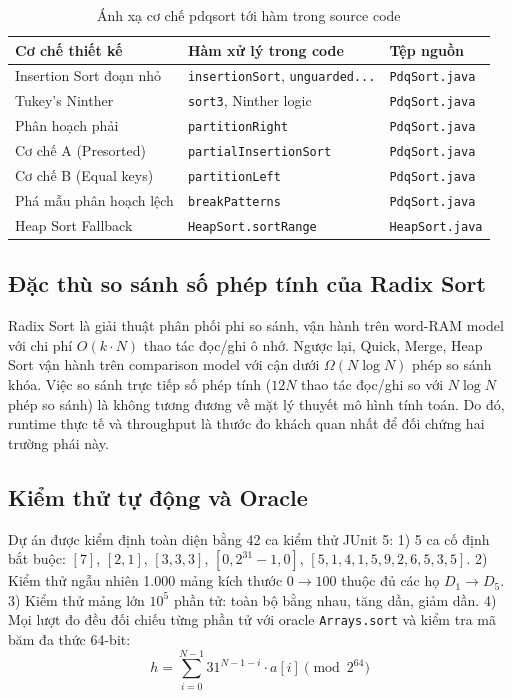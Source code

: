 \documentclass[conference]{IEEEtran}
\begin{document}
\begin{table}[htbp]
\caption{Ánh xạ cơ chế pdqsort tới hàm trong source code}
\label{tab:code_mapping}
\centering
\footnotesize
\setlength{\tabcolsep}{2.5pt}
\begin{tabularx}{\columnwidth}{@{}l X l@{}}
\toprule
\textbf{Cơ chế thiết kế} & \textbf{Hàm xử lý trong code} & \textbf{Tệp nguồn} \\
\midrule
Insertion Sort đoạn nhỏ & \texttt{insertionSort}, \texttt{unguarded...} & \texttt{PdqSort.java} \\
Tukey's Ninther & \texttt{sort3}, Ninther logic & \texttt{PdqSort.java} \\
Phân hoạch phải & \texttt{partitionRight} & \texttt{PdqSort.java} \\
Cơ chế A (Presorted) & \texttt{partialInsertionSort} & \texttt{PdqSort.java} \\
Cơ chế B (Equal keys) & \texttt{partitionLeft} & \texttt{PdqSort.java} \\
Phá mẫu phân hoạch lệch & \texttt{breakPatterns} & \texttt{PdqSort.java} \\
Heap Sort Fallback & \texttt{HeapSort.sortRange} & \texttt{HeapSort.java} \\
\bottomrule
\end{tabularx}
\end{table}

\subsection{Đặc thù so sánh số phép tính của Radix Sort}
Radix Sort là giải thuật phân phối phi so sánh, vận hành trên word-RAM model với chi phí $O(k \cdot N)$ thao tác đọc/ghi ô nhớ. Ngược lại, Quick, Merge, Heap Sort vận hành trên comparison model với cận dưới $\Omega(N \log N)$ phép so sánh khóa. Việc so sánh trực tiếp số phép tính ($12N$ thao tác đọc/ghi so với $N \log N$ phép so sánh) là không tương đương về mặt lý thuyết mô hình tính toán. Do đó, runtime thực tế và throughput là thước đo khách quan nhất để đối chứng hai trường phái này.

\subsection{Kiểm thử tự động và Oracle}
Dự án được kiểm định toàn diện bằng 42 ca kiểm thử JUnit 5:
1) 5 ca cố định bắt buộc: $[7]$, $[2, 1]$, $[3, 3, 3]$, $[0, 2^{31}-1, 0]$, $[5, 1, 4, 1, 5, 9, 2, 6, 5, 3, 5]$.
2) Kiểm thử ngẫu nhiên 1.000 mảng kích thước $0 \to 100$ thuộc đủ các họ $D_1 \to D_5$.
3) Kiểm thử mảng lớn $10^5$ phần tử: toàn bộ bằng nhau, tăng dần, giảm dần.
4) Mọi lượt đo đều đối chiếu từng phần tử với oracle \texttt{Arrays.sort} và kiểm tra mã băm đa thức 64-bit:
\begin{equation}
h = \sum_{i=0}^{N-1} 31^{N-1-i} \cdot a[i] \pmod{2^{64}}
\end{equation}
\end{document}
